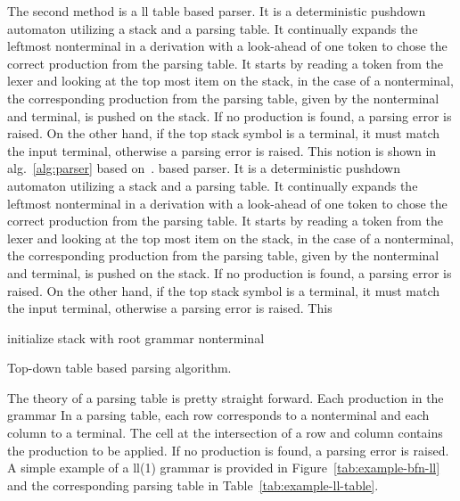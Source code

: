 The second method is a \gls{ll} table based parser. It is a deterministic pushdown automaton utilizing a stack and a parsing table. It continually expands the leftmost nonterminal in a derivation with a look-ahead of one token to chose the correct production from the parsing table. It starts by reading a token from the lexer and looking at the top most item on the stack, in the case of a nonterminal, the corresponding production from the parsing table, given by the nonterminal and terminal, is pushed on the stack. If no production is found, a parsing error is raised. On the other hand, if the top stack symbol is a terminal, it must match the input terminal, otherwise a parsing error is raised. This notion is shown in alg.~\ref{alg:parser} based on~\cite[Table 4.12.]{Holub_1990}.
based parser. It is a deterministic pushdown automaton utilizing a stack and a parsing table. It continually expands the leftmost nonterminal in a derivation with a look-ahead of one token to chose the correct production from the parsing table. It starts by reading a token from the lexer and looking at the top most item on the stack, in the case of a nonterminal, the corresponding production from the parsing table, given by the nonterminal and terminal, is pushed on the stack. If no production is found, a parsing error is raised. On the other hand, if the top stack symbol is a terminal, it must match the input terminal, otherwise a parsing error is raised. This 
\begingroup
\vspace{1.5em}
\begin{algorithm}[H]\label{alg:parser}
  \setlength{\algomargin}{1.5em}

  initialize stack with root grammar nonterminal

\caption{Top-down table based parsing algorithm.}
\end{algorithm}
\vspace{1.5em}
\endgroup

The theory of a parsing table is pretty straight forward. Each production in the grammar 
In a parsing table, each row corresponds to a nonterminal and each column to a terminal. The cell at the intersection of a row and column contains the production to be applied. If no production is found, a parsing error is raised. A simple example of a \gls{ll}(1) grammar is provided in Figure~\ref{tab:example-bfn-ll} and the corresponding parsing table in Table~\ref{tab:example-ll-table}.

